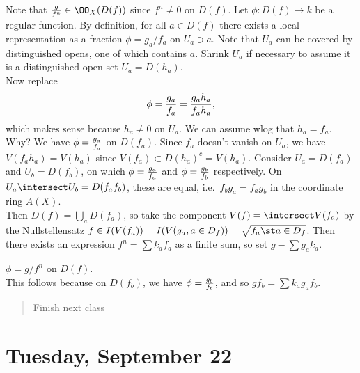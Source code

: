 \begin{proposition}[?]

Note that \({g\over f^n} \in \OO_X(D(f))\) since \(f^n\neq 0\) on
\(D(f)\). Let \(\phi: D(f) \to k\) be a regular function. By definition,
for all \(a\in D(f)\) there exists a local representation as a fraction
\(\phi = g_a/f_a\) on \(U_a\ni a\). Note that \(U_a\) can be covered by
distinguished opens, one of which contains \(a\). Shrink \(U_a\) if
necessary to assume it is a distinguished open set \(U_a = D(h_a)\).\\

Now replace
\begin{align*}  
\phi = {g_a \over f_a} = {g_a h_a \over f_a h_a}
,\end{align*} which makes sense because \(h_a\neq 0\) on \(U_a\). We can
assume wlog that \(h_a = f_a\). Why? We have \(\phi = {g_a \over f_a}\)
on \(D(f_a)\). Since \(f_a\) doesn't vanish on \(U_a\), we have
\(V(f_a h_a) = V(h_a)\) since \(V(f_a) \subset D(h_a)^c = V(h_a)\).
Consider \(U_a = D(f_a)\) and \(U_b = D(f_b)\), on which
\(\phi = {g_a\over f_a}\) and \(\phi = {g_b \over f_b}\) respectively.
On \(U_a\intersect U_b = D(f_a f_b)\), these are equal,
i.e.~\(f_b g_a = f_a g_b\) in the coordinate ring \(A(X)\).\\

Then \(D(f) = \bigcup_a D(f_a)\), so take the component
\(V(f) = \intersect V(f_a)\) by the Nullstellensatz
\(f\in I(V(f_a)) = I(V(g_a, a\in D_f)) = \sqrt{f_a \st a\in D_f}\). Then
there exists an expression \(f^n = \sum k_a f_a\) as a finite sum, so
set \(g - \sum g_a k_a\).

\begin{claim}

\(\phi = g/f^n\) on \(D(f)\).\\

This follows because on \(D(f_b)\), we have \(\phi = {g_b \over f_b}\),
and so \(gf_b = \sum k_a g_a f_b\).

\end{claim}

\begin{quote}
Finish next class
\end{quote}

\end{proposition}

\hypertarget{tuesday-september-22}{%
\section{Tuesday, September 22}\label{tuesday-september-22}}

